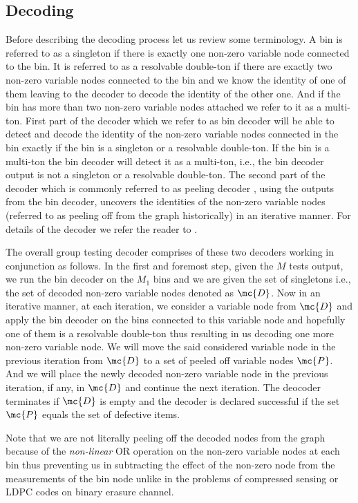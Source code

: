 \documentclass[conference,twocolumn]{IEEEtran}
\begin{document}
\subsection*{Decoding}
Before describing the decoding process let us review some terminology. A bin is referred to as a singleton if there is exactly one non-zero variable node connected to the bin. It is referred to as a resolvable double-ton if there are exactly two non-zero variable nodes connected to the bin and we know the identity of one of them leaving to the decoder to decode the identity of the other one. And if the bin has more than two non-zero variable nodes attached we refer to it as a multi-ton. First part of the decoder which we refer to as bin decoder will be able to detect and decode the identity of the non-zero variable nodes connected in the bin exactly if the bin is a singleton or a resolvable double-ton. If the bin is a multi-ton the bin decoder will detect it as a multi-ton, i.e., the bin decoder output is not a singleton or a resolvable double-ton. The second part of the decoder which is commonly referred to as peeling decoder \cite{li2015subisit}, using the outputs from the bin decoder, uncovers the identities of the non-zero variable nodes (referred to as peeling off from the graph historically) in an iterative manner. For details of the decoder we refer the reader to \cite{lee2015saffron}.

The overall group testing decoder comprises of these two decoders working in conjunction as follows. In the first and foremost step, given the $M$ tests output, we run the bin decoder on the $M_1$ bins and we are given the set of singletons i.e., the set of decoded non-zero variable nodes denoted as $\mc{D}$. Now in an iterative manner, at each iteration, we consider a variable node from $\mc{D}$ and apply the bin decoder on the bins connected to this variable node and hopefully one of them is a resolvable double-ton thus resulting in us decoding one more non-zero variable node. We will move the said considered variable node in the previous iteration from $\mc{D}$ to a set of peeled off variable nodes $\mc{P}$. And we will place the newly decoded non-zero variable node in the previous iteration, if any, in $\mc{D}$ and continue the next iteration. The deocoder terminates if $\mc{D}$ is empty and the decoder is declared successful if the set $\mc{P}$ equals the set of defective items. 
\begin{Remark}
 Note that we are not literally peeling off the decoded nodes from the graph because of the \textit{non-linear} OR operation on the non-zero variable nodes at each bin thus preventing us in subtracting the effect of the non-zero node from the measurements of the bin node unlike in the problems of compressed sensing or LDPC codes on binary erasure channel.
\end{Remark}
\end{document}
